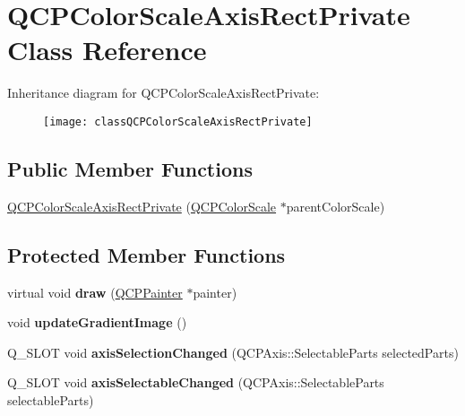 \hypertarget{classQCPColorScaleAxisRectPrivate}{}\section{Q\+C\+P\+Color\+Scale\+Axis\+Rect\+Private Class Reference}
\label{classQCPColorScaleAxisRectPrivate}
Inheritance diagram for Q\+C\+P\+Color\+Scale\+Axis\+Rect\+Private\+:\begin{figure}[H]
\begin{center}
\leavevmode
\texttt{[image: classQCPColorScaleAxisRectPrivate]}
\end{center}
\end{figure}
\subsection*{Public Member Functions}
\begin{DoxyCompactItemize}
\item 
\hyperlink{classQCPColorScaleAxisRectPrivate_ad3b242f75dd2b33581364a4e668a80db}{Q\+C\+P\+Color\+Scale\+Axis\+Rect\+Private} (\hyperlink{classQCPColorScale}{Q\+C\+P\+Color\+Scale} $\ast$parent\+Color\+Scale)
\end{DoxyCompactItemize}
\subsection*{Protected Member Functions}
\begin{DoxyCompactItemize}
\item 
\hypertarget{classQCPColorScaleAxisRectPrivate_adb67bfe9057a9dd9a85f548c274e6d98}{}virtual void {\bfseries draw} (\hyperlink{classQCPPainter}{Q\+C\+P\+Painter} $\ast$painter)\label{classQCPColorScaleAxisRectPrivate_adb67bfe9057a9dd9a85f548c274e6d98}

\item 
\hypertarget{classQCPColorScaleAxisRectPrivate_a73754cab312aeaddea1bfcc67cc079ac}{}void {\bfseries update\+Gradient\+Image} ()\label{classQCPColorScaleAxisRectPrivate_a73754cab312aeaddea1bfcc67cc079ac}

\item 
\hypertarget{classQCPColorScaleAxisRectPrivate_a6112ad4291ac1695d37659cb049d598d}{}Q\+\_\+\+S\+L\+O\+T void {\bfseries axis\+Selection\+Changed} (Q\+C\+P\+Axis\+::\+Selectable\+Parts selected\+Parts)\label{classQCPColorScaleAxisRectPrivate_a6112ad4291ac1695d37659cb049d598d}

\item 
\hypertarget{classQCPColorScaleAxisRectPrivate_a66d2baed86966bb03a6d7c32dc7d59f7}{}Q\+\_\+\+S\+L\+O\+T void {\bfseries axis\+Selectable\+Changed} (Q\+C\+P\+Axis\+::\+Selectable\+Parts selectable\+Parts)\label{classQCPColorScaleAxisRectPrivate_a66d2baed86966bb03a6d7c32dc7d59f7}

\end{DoxyCompactItemize}
